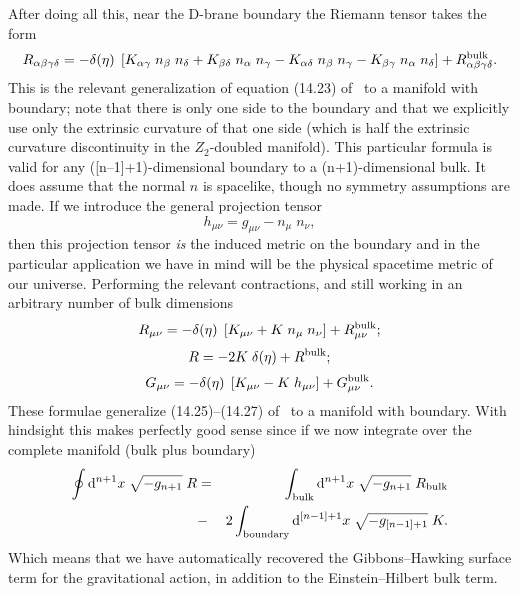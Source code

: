 \documentclass[a4paper,12pt]{article}
\begin{document}
After doing all this, near the D-brane boundary the Riemann
tensor takes the form
%
\begin{equation}
R_{\alpha\beta\gamma\delta} = 
- \delta(\eta) \; \left[
K_{\alpha\gamma} \; n_\beta \; n_\delta + 
K_{\beta\delta} \; n_\alpha \; n_\gamma -
K_{\alpha\delta} \; n_\beta \; n_\gamma -
K_{\beta\gamma} \; n_\alpha \; n_\delta
\right] +
R^{\mathrm{bulk}}_{\alpha\beta\gamma\delta}.
\end{equation}
%
This is the relevant generalization of equation (14.23) of~\cite{Book}
to a manifold with boundary; note that there is only one side to the
boundary and that we explicitly use only the extrinsic curvature of
that one side (which is half the extrinsic curvature discontinuity in
the $Z_2$-doubled manifold). This particular formula is valid for any
([n--1]+1)-dimensional boundary to a (n+1)-dimensional bulk. It does
assume that the normal $n$ is spacelike, though no symmetry
assumptions are made. If we introduce the general projection tensor
%
\begin{equation}
h_{\mu\nu} = g_{\mu\nu} - n_\mu \; n_\nu,
\end{equation}
%
then this projection tensor {\em is} the induced metric on the
boundary and in the particular application we have in mind will be the
physical spacetime metric of our universe.  Performing the relevant
contractions, and still working in an arbitrary number of bulk
dimensions
%
\begin{equation}
R_{\mu\nu} = - \delta(\eta) \; 
\left[ K_{\mu\nu} + K \; n_\mu \; n_\nu \right] + 
R^{\mathrm{bulk}}_{\mu\nu};
\end{equation}
%
\begin{equation}
R = -2 K \; \delta(\eta) + R^{\mathrm{bulk}};
\end{equation}
%
\begin{equation}
G_{\mu\nu} = - \delta(\eta) \;
\left[ K_{\mu\nu} - K \; h_{\mu\nu} \right] + G^{\mathrm{bulk}}_{\mu\nu}.
\end{equation}
%
These formulae generalize (14.25)--(14.27) of~\cite{Book} to a
manifold with boundary. With hindsight this makes perfectly good sense
since if we now integrate over the complete manifold (bulk plus
boundary)
%
\begin{eqnarray}
\oint {\mathrm d}^{n+1} x \; \sqrt{-g_{n+1}} \; R 
&=& 
\int_{\mathrm{bulk}} {\mathrm d}^{n+1} x \; \sqrt{-g_{n+1}} \; R_{\mathrm{bulk}} 
\nonumber\\
&-&
2 \int_{\mathrm{boundary}} {\mathrm d}^{[n-1]+1} x \; \sqrt{-g_{[n-1]+1}} \; K.
\end{eqnarray}
%
Which means that we have automatically recovered the Gibbons--Hawking
surface term for the gravitational action, in addition to the
Einstein--Hilbert bulk term.
\end{document}
